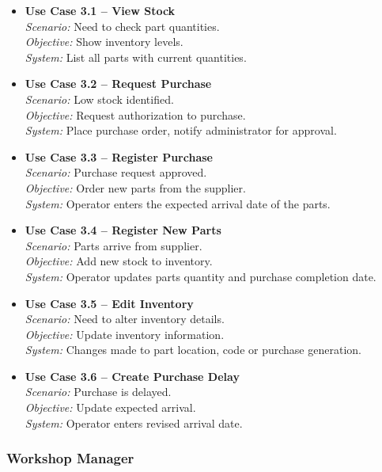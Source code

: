 \begin{itemize}
    \item \textbf{Use Case 3.1 – View Stock}\\
    \textit{Scenario:} Need to check part quantities.\\
    \textit{Objective:} Show inventory levels.\\
    \textit{System:} List all parts with current quantities.
    \item \textbf{Use Case 3.2 – Request Purchase}\\
    \textit{Scenario:} Low stock identified.\\
    \textit{Objective:} Request authorization to purchase.\\
    \textit{System:} Place purchase order, notify administrator for approval.
    \item \textbf{Use Case 3.3 – Register Purchase}\\
    \textit{Scenario:} Purchase request approved.\\
    \textit{Objective:} Order new parts from the supplier.\\
    \textit{System:} Operator enters the expected arrival date of the parts.
    \item \textbf{Use Case 3.4 – Register New Parts}\\
    \textit{Scenario:} Parts arrive from supplier.\\
    \textit{Objective:} Add new stock to inventory.\\
    \textit{System:} Operator updates parts quantity and purchase completion date.
    \item \textbf{Use Case 3.5 – Edit Inventory}\\
    \textit{Scenario:} Need to alter inventory details.\\
    \textit{Objective:} Update inventory information.\\
    \textit{System:} Changes made to part location, code or purchase generation.
    \item \textbf{Use Case 3.6 – Create Purchase Delay}\\
    \textit{Scenario:} Purchase is delayed.\\
    \textit{Objective:} Update expected arrival.\\
    \textit{System:} Operator enters revised arrival date.
\end{itemize}




\subsubsection{Workshop Manager}

